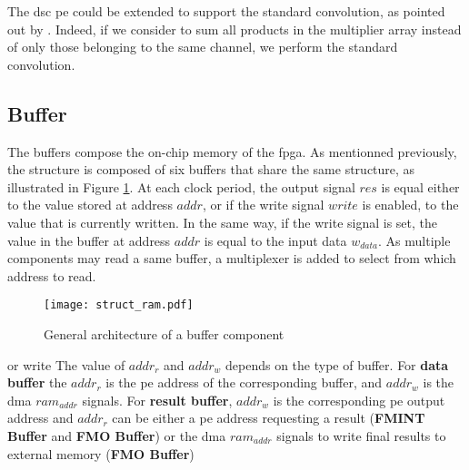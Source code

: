 The \acrshort{dsc} \acrshort{pe} could be extended to support the standard convolution, as pointed out by \textcite{bai_cnn_2018}. Indeed, if we consider to sum all products in the multiplier array instead of only those belonging to the same channel, we perform the standard convolution.
%
\subsection{Buffer}
%
The buffers compose the on-chip memory of the \acrshort{fpga}. As mentionned previously, the structure is composed of six buffers that share the same structure, as illustrated in Figure \ref{fig:struct_ram}. At each clock period, the output signal $res$ is equal either to the value stored at address $addr$, or if the write signal $write$ is enabled, to the value that is currently written. In the same way, if the write signal is set, the value in the buffer at address $addr$ is equal to the input data $w_{data}$. As multiple components may read a same buffer, a multiplexer is added to select from which address to read.
%
\begin{figure}[H]
    \centering
    \texttt{[image: struct\_ram.pdf]}
    \caption{General architecture of a buffer component}
    \label{fig:struct_ram}
\end{figure}
or write
The value of $addr_r$ and $addr_w$ depends on the type of buffer. For \textbf{data buffer} the $addr_r$ is the \acrshort{pe} address of the corresponding buffer, and $addr_w$ is the \acrshort{dma} $ram_{addr}$ signals. For \textbf{result buffer}, $addr_w$ is the corresponding \acrshort{pe} output address and $addr_r$ can be either a \acrshort{pe} address requesting a result (\textbf{FMINT Buffer} and \textbf{FMO Buffer}) or the \acrshort{dma} $ram_{addr}$ signals to write final results to external memory (\textbf{FMO Buffer})

